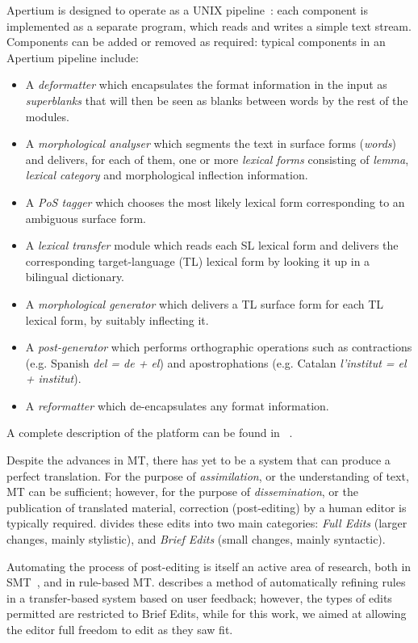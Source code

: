 \documentclass[11pt]{article}
\begin{document}
Apertium is designed to operate as a UNIX pipeline~\citep{mcilroy1978unix}: 
each component is implemented as a separate program, which reads and writes 
a simple text stream. Components can be added or removed as required: 
typical components in an Apertium pipeline include:
\begin{itemize}
\item A \emph{deformatter} which encapsulates the format information
 in the input as \emph{superblanks} that will then be seen
 as blanks between words by the rest of the modules.
\item A \emph{morphological analyser} which segments the text in
 surface forms (\emph{words}) and delivers, for each of them,
 one or more \emph{lexical forms} consisting of \emph{lemma},
 \emph{lexical category} and morphological inflection information.
\item A \emph{PoS tagger} which chooses the most
 likely lexical form corresponding to an ambiguous surface form.
\item A \emph{lexical transfer} module which reads each SL lexical
 form and delivers the corresponding target-language (TL) lexical
 form by looking it up in a bilingual dictionary.
\item A \emph{morphological generator} which delivers a TL surface
  form for each TL lexical form, by suitably inflecting it.
\item A \emph{post-generator} which performs orthographic operations
  such as contractions (e.g. Spanish \emph{del = de + el}) and
  apostrophations (e.g. Catalan \emph{l'institut = el + institut}).
\item A \emph{reformatter} which de-encapsulates any format
  information.
\end{itemize}

A complete description of the platform can be found in ~\cite{forcada09p}.

Despite the advances in MT, there has yet to be a system that can
produce a perfect translation. For the purpose of {\it assimilation},
or the understanding of text, MT can be sufficient; however, for the
purpose of {\it dissemination}, or the publication of translated
material, correction (post-editing) by a human editor is typically 
required. \cite{Doyon08} divides these edits into two main categories:
{\it Full Edits} (larger changes, mainly stylistic), and {\it Brief
Edits} (small changes, mainly syntactic).

Automating the process of post-editing is itself an active area of
research, both in SMT~\citep{Chin08}, and in rule-based MT.
\cite{llitjos04} describes a method of automatically refining rules
in a transfer-based system based on user feedback; however, the types
of edits permitted are restricted to Brief Edits, while for this work,
we aimed at allowing the editor full freedom to edit as they saw fit. 
\end{document}
